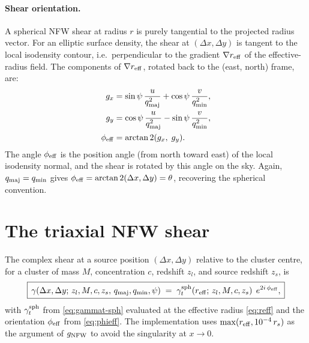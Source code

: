 \documentclass[11pt,a4paper]{article}
\newcommand{\Reff}{r_{\rm eff}}
\begin{document}
\paragraph{Shear orientation.}
A spherical NFW shear at radius $r$ is purely tangential to the
projected radius vector. For an elliptic surface density, the shear at
$(\Delta x, \Delta y)$ is tangent to the local isodensity contour,
i.e.\ perpendicular to the gradient $\nabla \Reff$ of the
effective-radius field. The components of $\nabla \Reff$, rotated back to
the (east, north) frame, are:
\begin{align}
g_x &= \sin\psi\,\frac{u}{q_{\rm maj}^2}
     + \cos\psi\,\frac{v}{q_{\rm min}^2},
\\
g_y &= \cos\psi\,\frac{u}{q_{\rm maj}^2}
     - \sin\psi\,\frac{v}{q_{\rm min}^2},
\\
\phi_{\rm eff} &= \arctan2(g_x,\; g_y).
\label{eq:phieff}
\end{align}
The angle $\phi_{\rm eff}$ is the position angle (from north toward east)
of the local isodensity normal, and the shear is rotated by this angle
on the sky. Again, $q_{\rm maj}=q_{\rm min}$ gives
$\phi_{\rm eff}=\arctan2(\Delta x, \Delta y)=\theta$, recovering the
spherical convention.

\section{The triaxial NFW shear}

The complex shear at a source position $(\Delta x, \Delta y)$ relative
to the cluster centre, for a cluster of mass $M$, concentration $c$,
redshift $z_l$, and source redshift $z_s$, is
\begin{equation}
\boxed{\,
\gamma(\Delta x, \Delta y;\,z_l, M, c, z_s,\, q_{\rm maj}, q_{\rm min}, \psi)
\;=\;
\gamma_t^{\rm sph}\!\left(\Reff;\,z_l, M, c, z_s\right)\;
e^{2i\,\phi_{\rm eff}},
\,}
\label{eq:tri-shear}
\end{equation}
with $\gamma_t^{\rm sph}$ from \eqref{eq:gammat-sph} evaluated at the
effective radius \eqref{eq:reff} and the orientation $\phi_{\rm eff}$
from \eqref{eq:phieff}. The implementation uses
$\max(\Reff, 10^{-4}\,r_s)$ as the argument of $g_{\rm NFW}$ to avoid
the singularity at $x \to 0$.
\end{document}
